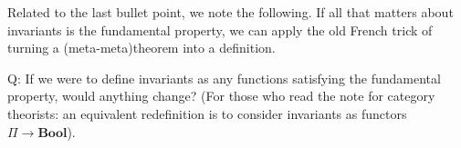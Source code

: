 Related to the last bullet point, we note the following. If all that matters about invariants is the fundamental property, we can apply the old French trick of turning a (meta-meta)theorem into a definition.

Q: If we were to define invariants as any functions satisfying the fundamental property, would anything change? (For those who read the note for category theorists: an equivalent redefinition is to consider invariants as functors $\Pi \to \textbf{Bool}$).
